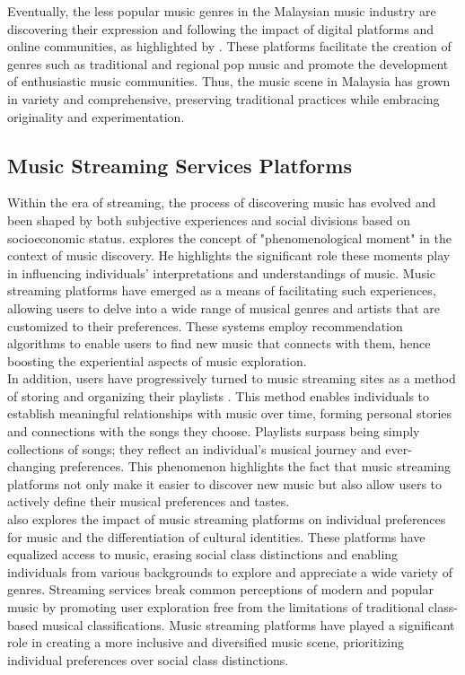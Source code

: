 Eventually, the less popular music genres in the Malaysian music industry are discovering their expression and following the impact of digital platforms and online communities, as highlighted by \textcite{silahudin19}. These platforms facilitate the creation of genres such as traditional and regional pop music and promote the development of enthusiastic music communities. Thus, the music scene in Malaysia has grown in variety and comprehensive, preserving traditional practices while embracing originality and experimentation. \pagebreak

\subsection{Music Streaming Services Platforms}
Within the era of streaming, the process of discovering music has evolved and been shaped by both subjective experiences and social divisions based on socioeconomic status. \textcite{ellis20} explores the concept of "phenomenological moment" in the context of music discovery. He highlights the significant role these moments play in influencing individuals' interpretations and understandings of music. Music streaming platforms have emerged as a means of facilitating such experiences, allowing users to delve into a wide range of musical genres and artists that are customized to their preferences. These systems employ recommendation algorithms to enable users to find new music that connects with them, hence boosting the experiential aspects of music exploration. \\

In addition, users have progressively turned to music streaming sites as a method of storing and organizing their playlists \parencite{ellis20}. This method enables individuals to establish meaningful relationships with music over time, forming personal stories and connections with the songs they choose. Playlists surpass being simply collections of songs; they reflect an individual's musical journey and ever-changing preferences. This phenomenon highlights the fact that music streaming platforms not only make it easier to discover new music but also allow users to actively define their musical preferences and tastes. \\

\textcite{webster19} also explores the impact of music streaming platforms on individual preferences for music and the differentiation of cultural identities. These platforms have equalized access to music, erasing social class distinctions and enabling individuals from various backgrounds to explore and appreciate a wide variety of genres. Streaming services break common perceptions of modern and popular music by promoting user exploration free from the limitations of traditional class-based musical classifications. Music streaming platforms have played a significant role in creating a more inclusive and diversified music scene, prioritizing individual preferences over social class distinctions. \pagebreak

